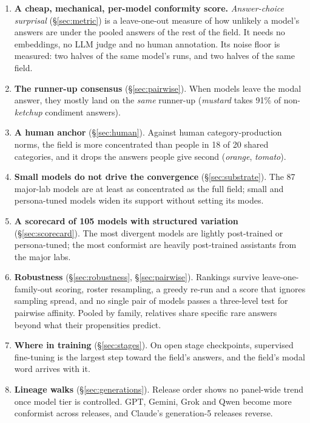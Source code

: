 \documentclass[11pt]{article}
\begin{document}
\begin{enumerate}
\item \textbf{A cheap, mechanical, per-model conformity score.} \emph{Answer-choice surprisal} (\S\ref{sec:metric}) is a leave-one-out measure of how unlikely a model's answers are under the pooled answers of the rest of the field. It needs no embeddings, no LLM judge and no human annotation. Its noise floor is measured: two halves of the same model's runs, and two halves of the same field.
\item \textbf{The runner-up consensus} (\S\ref{sec:pairwise}). When models leave the modal answer, they mostly land on the \emph{same} runner-up (\emph{mustard} takes 91\% of non-\emph{ketchup} condiment answers).
\item \textbf{A human anchor} (\S\ref{sec:human}). Against human category-production norms, the field is more concentrated than people in 18 of 20 shared categories, and it drops the answers people give second (\emph{orange}, \emph{tomato}).
\item \textbf{Small models do not drive the convergence} (\S\ref{sec:substrate}). The 87 major-lab models are at least as concentrated as the full field; small and persona-tuned models widen its support without setting its modes.
\item \textbf{A scorecard of 105 models with structured variation} (\S\ref{sec:scorecard}). The most divergent models are lightly post-trained or persona-tuned; the most conformist are heavily post-trained assistants from the major labs.
\item \textbf{Robustness} (\S\ref{sec:robustness}, \S\ref{sec:pairwise}). Rankings survive leave-one-family-out scoring, roster resampling, a greedy re-run and a score that ignores sampling spread, and no single pair of models passes a three-level test for pairwise affinity. Pooled by family, relatives share specific rare answers beyond what their propensities predict.
\item \textbf{Where in training} (\S\ref{sec:stages}). On open stage checkpoints, supervised fine-tuning is the largest step toward the field's answers, and the field's modal word arrives with it.
\item \textbf{Lineage walks} (\S\ref{sec:generations}). Release order shows no panel-wide trend once model tier is controlled. GPT, Gemini, Grok and Qwen become more conformist across releases, and Claude's generation-5 releases reverse.
\end{enumerate}
\end{document}
